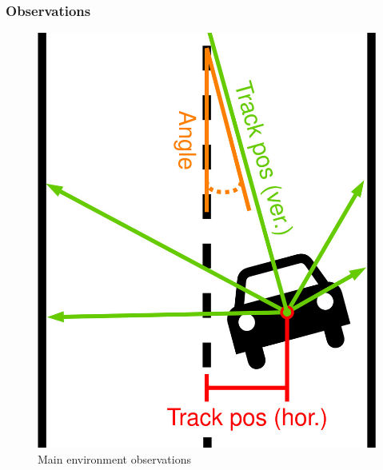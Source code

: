 \subsubsection{Observations}
\label{sec:observations}

\begin{figure}[ht]
    \includegraphics[width=0.3\linewidth]{figures/Observations.jpg}
    \centering
    \caption{Main environment observations}
    \label{fig:observations}
\end{figure}


